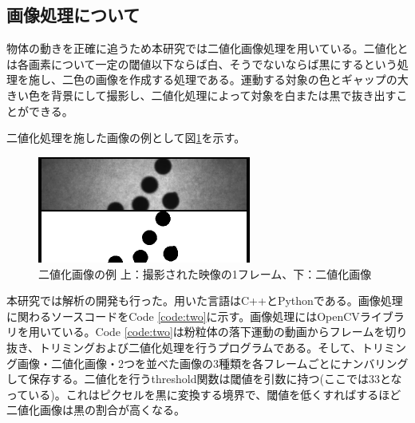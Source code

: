 \documentclass[a4paper,10pt,twocolumn,dvipdfmx]{jsarticle}
\begin{document}
\subsection{画像処理について}
物体の動きを正確に追うため本研究では二値化画像処理を用いている。二値化とは各画素について一定の閾値以下ならば白、そうでないならば黒にするという処理を施し、二色の画像を作成する処理である。運動する対象の色とギャップの大きい色を背景にして撮影し、二値化処理によって対象を白または黒で抜き出すことができる。 \par
二値化処理を施した画像の例として図\ref{fig:threshold}を示す。
\begin{figure}[H]
	\includegraphics[clip,width=7.0cm]{bb_image.png}
	\caption{二値化画像の例 上：撮影された映像の1フレーム、下：二値化画像}
	\label{fig:threshold}
\end{figure}
本研究では解析の開発も行った。用いた言語はC++とPythonである。画像処理に関わるソースコードをCode \ref{code:two}に示す。画像処理にはOpenCVライブラリを用いている。Code \ref{code:two}は粉粒体の落下運動の動画からフレームを切り抜き、トリミングおよび二値化処理を行うプログラムである。そして、トリミング画像・二値化画像・2つを並べた画像の3種類を各フレームごとにナンバリングして保存する。二値化を行うthreshold関数は閾値を引数に持つ(ここでは33となっている)。これはピクセルを黒に変換する境界で、閾値を低くすればするほど二値化画像は黒の割合が高くなる。

\end{document}
